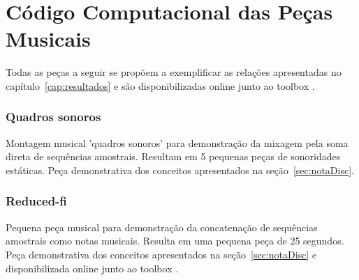 \chapter{Código Computacional das Peças Musicais}
\label{cap:codigoPecas}
Todas as peças a seguir se propõem a exemplificar as relações apresentadas no capítulo~\ref{cap:resultados} e são disponibilizadas online junto ao toolbox \massa.\cite{MASSA}


\subsection{Quadros sonoros}\label{ap:quadros}
Montagem musical 'quadros sonoros' para demonstração da mixagem pela soma direta de sequências amostrais. Resultam em 5 pequenas peças de sonoridades estáticas. Peça demonstrativa dos conceitos apresentados na seção~\ref{sec:notaDisc}.


\subsection{Reduced-fi}\label{ap:reduced}
Pequena peça musical para demonstração da concatenação de sequências amostrais como notas musicais. Resulta em uma pequena peça de 25 segundos. Peça demonstrativa dos conceitos apresentados na seção~\ref{sec:notaDisc} e disponibilizada online junto ao toolbox \massa.

